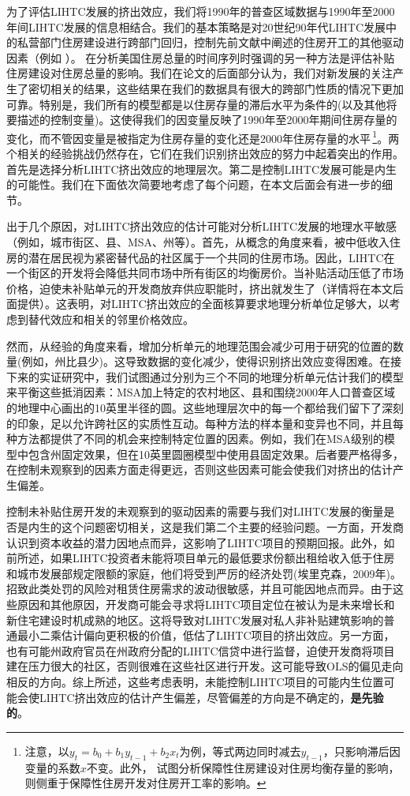 \documentclass[lang=cn,11pt,a4paper]{paper}
\begin{document}
为了评估LIHTC发展的挤出效应，我们将1990年的普查区域数据与1990年至2000年间LIHTC发展的信息相结合。我们的基本策略是对20世纪90年代LIHTC发展中的私营部门住房建设进行跨部门回归，控制先前文献中阐述的住房开工的其他驱动因素（例如 \cite{Mayer200085}）。\cite{Murray1999107} 在分析美国住房总量的时间序列时强调的另一种方法是评估补贴住房建设对住房总量的影响。我们在论文的后面部分认为，我们对新发展的关注产生了密切相关的结果，这些结果在我们的数据具有很大的跨部门性质的情况下更加可靠。特别是，我们所有的模型都是以住房存量的滞后水平为条件的(以及其他将要描述的控制变量)。这使得我们的因变量反映了1990年至2000年期间住房存量的变化，而不管因变量是被指定为住房存量的变化还是2000年住房存量的水平\,\footnote{注意，以$y_t=b_0+b_1y_{t-1}+b_2x_t$为例，等式两边同时减去$y_{t-1}$，只影响滞后因变量的系数$x$不变。此外，\cite{Murray1999107} 试图分析保障性住房建设对住房均衡存量的影响，\cite{Murray1983590} 则侧重于保障性住房开发对住房开工率的影响。}。两个相关的经验挑战仍然存在，它们在我们识别挤出效应的努力中起着突出的作用。首先是选择分析LIHTC挤出效应的地理层次。第二是控制LIHTC发展可能是内生的可能性。我们在下面依次简要地考虑了每个问题，在本文后面会有进一步的细节。

出于几个原因，对LIHTC挤出效应的估计可能对分析LIHTC发展的地理水平敏感（例如，城市街区、县、MSA、州等）。首先，从概念的角度来看，被中低收入住房的潜在居民视为紧密替代品的社区属于一个共同的住房市场。因此，LIHTC在一个街区的开发将会降低共同市场中所有街区的均衡房价。当补贴活动压低了市场价格，迫使未补贴单元的开发商放弃供应职能时，挤出就发生了（详情将在本文后面提供）。这表明，对LIHTC挤出效应的全面核算要求地理分析单位足够大，以考虑到替代效应和相关的邻里价格效应。

然而，从经验的角度来看，增加分析单元的地理范围会减少可用于研究的位置的数量(例如，州比县少)。这导致数据的变化减少，使得识别挤出效应变得困难。在接下来的实证研究中，我们试图通过分别为三个不同的地理分析单元估计我们的模型来平衡这些抵消因素：MSA加上特定的农村地区、县和围绕2000年人口普查区域的地理中心画出的10英里半径的圆。这些地理层次中的每一个都给我们留下了深刻的印象，足以允许跨社区的实质性互动。每种方法的样本量和变异也不同，并且每种方法都提供了不同的机会来控制特定位置的因素。例如，我们在MSA级别的模型中包含州固定效果，但在10英里圆圈模型中使用县固定效果。后者要严格得多，在控制未观察到的因素方面走得更远，否则这些因素可能会使我们对挤出的估计产生偏差。

控制未补贴住房开发的未观察到的驱动因素的需要与我们对LIHTC发展的衡量是否是内生的这个问题密切相关，这是我们第二个主要的经验问题。一方面，开发商认识到资本收益的潜力因地点而异，这影响了LIHTC项目的预期回报。此外，如前所述，如果LIHTC投资者未能将项目单元的最低要求份额出租给收入低于住房和城市发展部规定限额的家庭，他们将受到严厉的经济处罚(埃里克森，2009年)。招致此类处罚的风险对租赁住房需求的波动很敏感，并且可能因地点而异。由于这些原因和其他原因，开发商可能会寻求将LIHTC项目定位在被认为是未来增长和新住宅建设时机成熟的地区。这将导致对LIHTC发展对私人非补贴建筑影响的普通最小二乘估计偏向更积极的价值，低估了LIHTC项目的挤出效应。另一方面，也有可能州政府官员在州政府分配的LIHTC信贷中进行监督，迫使开发商将项目建在压力很大的社区，否则很难在这些社区进行开发。这可能导致OLS的偏见走向相反的方向。综上所述，这些考虑表明，未能控制LIHTC项目的可能内生位置可能会使LIHTC挤出效应的估计产生偏差，尽管偏差的方向是不确定的，\textbf{是先验的}。
\end{document}
